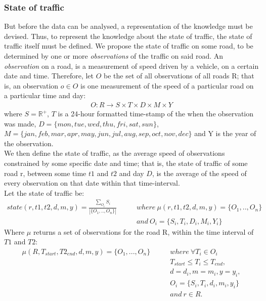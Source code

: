 \subsubsection*{State of traffic}
But before the data can be analysed, a representation of the knowledge must be devised. Thus, to represent the knowledge about the state of traffic, the state of traffic itself must be defined. We propose the state of traffic on some road, to be determined by one or more \emph{observations} of the traffic on said road. An \emph{observation} on a road, is a measurement of speed driven by a vehicle, on a certain date and time. Therefore, let $O$ be the set of all observations of all roads R; that is, an observation $o \in O$ is one measurement of the speed of a particular road on a particular time and day:
\begin{align*}
O: R \rightarrow S \times T \times D \times M \times Y
\end{align*}
where $S = \mathbb R^{+}$, $T$ is a 24-hour formatted time-stamp of the when the observation was made, $D= \{mon, tue, wed, thu, fri, sat, sun\}$,\\ $M = \{jan, feb, mar, apr, may, jun, jul, aug, sep, oct, nov, dec\}$ and Y is the year of the observation. \\
We then define the state of traffic, as the average speed of observations constrained by some specific date and time; that is, the state of traffic of some road r, between some time $t1$ and $t2$ and day $D$, is the average of the speed of every observation on that date within that time-interval.\\
Let the state of traffic be:
\begin{align*}
state(r, t1, t2, d, m, y) = \frac{\sum\limits_{O_i} S_i}{|\{O_1,..,O_n\}|} \qquad 
&where \: \mu (r,t1,t2, d, m, y) = \{O_1,..,O_n\} \\
&and \: O_i=\{S_i, T_i, D_i, M_i, Y_i\}
\end{align*}
Where $\mu$ returns a set of observations for the road R, within the time interval of $T1$ and $T2$:
\begin{align*}
\mu(R,T_{start},T2_{end}, d, m, y) = \{O_1,...,O_n\} \qquad &where \: \forall T_i \in O_i\\
&T_{start} \leq T_i \leq T_{end}, \\
&d = d_i, m = m_i, y = y_i, \\
&O_i = \{S_i, T_i, d_i, m_i, y_i\} \\
&and \: r \in R.\\
\end{align*}
